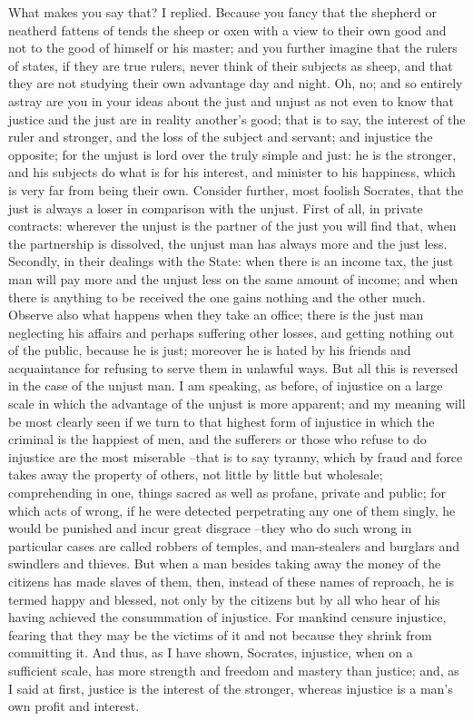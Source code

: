 What makes you say that? I replied.
Because you fancy that the shepherd or neatherd fattens of tends the sheep or oxen with a view to their own good and not to the good of himself or his master; and you further imagine that the rulers of states, if they are true rulers, never think of their subjects as sheep, and that they are not studying their own advantage day and night. Oh, no; and so entirely astray are you in your ideas about the just and unjust as not even to know that justice and the just are in reality another's good; that is to say, the interest of the ruler and stronger, and the loss of the subject and servant; and injustice the opposite; for the unjust is lord over the truly simple and just: he is the stronger, and his subjects do what is for his interest, and minister to his happiness, which is very far from being their own. Consider further, most foolish Socrates, that the just is always a loser in comparison with the unjust. First of all, in private contracts: wherever the unjust is the partner of the just you will find that, when the partnership is dissolved, the unjust man has always more and the just less. Secondly, in their dealings with the State: when there is an income tax, the just man will pay more and the unjust less on the same amount of income; and when there is anything to be received the one gains nothing and the other much. Observe also what happens when they take an office; there is the just man neglecting his affairs and perhaps suffering other losses, and getting nothing out of the public, because he is just; moreover he is hated by his friends and acquaintance for refusing to serve them in unlawful ways. But all this is reversed in the case of the unjust man. I am speaking, as before, of injustice on a large scale in which the advantage of the unjust is more apparent; and my meaning will be most clearly seen if we turn to that highest form of injustice in which the criminal is the happiest of men, and the sufferers or those who refuse to do injustice are the most miserable --that is to say tyranny, which by fraud and force takes away the property of others, not little by little but wholesale; comprehending in one, things sacred as well as profane, private and public; for which acts of wrong, if he were detected perpetrating any one of them singly, he would be punished and incur great disgrace --they who do such wrong in particular cases are called robbers of temples, and man-stealers and burglars and swindlers and thieves. But when a man besides taking away the money of the citizens has made slaves of them, then, instead of these names of reproach, he is termed happy and blessed, not only by the citizens but by all who hear of his having achieved the consummation of injustice. For mankind censure injustice, fearing that they may be the victims of it and not because they shrink from committing it. And thus, as I have shown, Socrates, injustice, when on a sufficient scale, has more strength and freedom and mastery than justice; and, as I said at first, justice is the interest of the stronger, whereas injustice is a man's own profit and interest.

